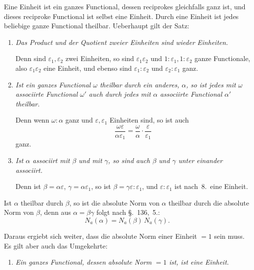 \documentclass[12pt,a4paper]{article}
\theoremstyle{definition}
\begin{document}
Eine Einheit ist ein ganzes Functional, dessen reciprokes gleichfalls ganz ist, und dieses reciproke Functional ist selbst eine Einheit. Durch eine Einheit ist jedes beliebige ganze Functional theilbar. Ueberhaupt gilt der Satz:

\begin{enumerate}[label=\arabic*., resume]
\item \textit{Das Product und der Quotient zweier Einheiten sind wieder Einheiten.}

Denn sind $\varepsilon_1,\varepsilon_2$ zwei Einheiten, so sind $\varepsilon_1\varepsilon_2$ und $1:\varepsilon_1,1:\varepsilon_2$ ganze Functionale, also $\varepsilon_1\varepsilon_2$ eine Einheit, und ebenso sind $\varepsilon_1:\varepsilon_2$ und $\varepsilon_2:\varepsilon_1$ ganz.

\item \textit{Ist ein ganzes Functional $\omega$ theilbar durch ein anderes, $\alpha$, so ist jedes mit $\omega$ associirte Functional $\omega'$ auch durch jedes mit $\alpha$ associirte Functional $\alpha'$ theilbar.}

Denn wenn $\omega:\alpha$ ganz und $\varepsilon,\varepsilon_1$ Einheiten sind, so ist auch
\[
\frac{\omega\varepsilon}{\alpha\varepsilon_1} = \frac{\omega}{\alpha}\cdot\frac{\varepsilon}{\varepsilon_1}
\]
ganz.

\item \textit{Ist $\alpha$ associirt mit $\beta$ und mit $\gamma$, so sind auch $\beta$ und $\gamma$ unter einander associirt.}

Denn ist $\beta=\alpha\varepsilon$, $\gamma=\alpha\varepsilon_1$, so ist $\beta=\gamma\varepsilon:\varepsilon_1$, und $\varepsilon:\varepsilon_1$ ist nach~8.\ eine Einheit.
\end{enumerate}

Ist $\alpha$ theilbar durch $\beta$, so ist die absolute Norm von $\alpha$ theilbar durch die absolute Norm von $\beta$, denn aus $\alpha=\beta\gamma$ folgt nach \S.~136,~5.:
\begin{equation}\label{eq:138-1}
N_a(\alpha) = N_a(\beta)\,N_a(\gamma).
\end{equation}

Daraus ergiebt sich weiter, dass die absolute Norm einer Einheit $=1$ sein muss. Es gilt aber auch das Umgekehrte:

\begin{enumerate}[label=\arabic*., resume]
\item \textit{Ein ganzes Functional, dessen absolute Norm $=1$ ist, ist eine Einheit.}
\end{enumerate}
\end{document}
